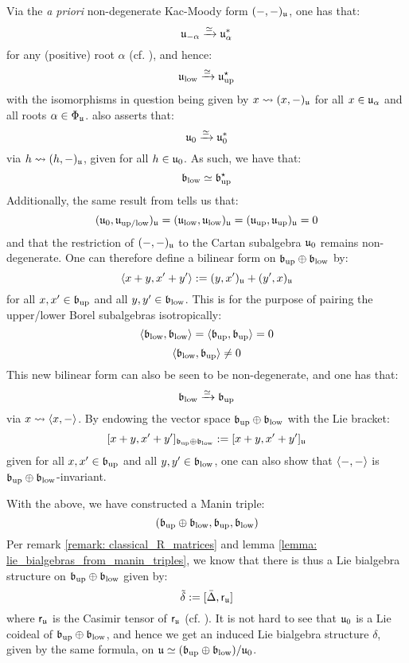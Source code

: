         \begin{example} \label{example: kac_moody_manin_triple}
            Via the \textit{a priori} non-degenerate Kac-Moody form $(-, -)_{\mathfrak{u}}$, one has that:
                $$\mathfrak{u}_{-\alpha} \xrightarrow[]{\simeq} \mathfrak{u}_{\alpha}^*$$
            for any (positive) root $\alpha$ (cf. \cite[Theorem 2.2]{kac_infinite_dimensional_lie_algebras}), and hence:
                $$\mathfrak{u}_{\mathrm{low}} \xrightarrow[]{\simeq} \mathfrak{u}_{\mathrm{up}}^{\star}$$
            with the isomorphisms in question being given by $x \leadsto (x, -)_{\mathfrak{u}}$ for all $x \in \mathfrak{u}_{\alpha}$ and all roots $\alpha \in \Phi_{\mathfrak{u}}$. \cite[Theorem 2.2]{kac_infinite_dimensional_lie_algebras} also asserts that:
                $$\mathfrak{u}_0 \xrightarrow[]{\simeq} \mathfrak{u}_0^*$$
            via $h \leadsto (h, -)_{\mathfrak{u}}$, given for all $h \in \mathfrak{u}_0$. As such, we have that:
                $$\mathfrak{b}_{\mathrm{low}} \simeq \mathfrak{b}_{\mathrm{up}}^{\star}$$
            Additionally, the same result from \cite{kac_infinite_dimensional_lie_algebras} tells us that:
                $$(\mathfrak{u}_0, \mathfrak{u}_{\mathrm{up}/\mathrm{low}})_{\mathfrak{u}} = (\mathfrak{u}_{\mathrm{low}}, \mathfrak{u}_{\mathrm{low}})_{\mathfrak{u}} = (\mathfrak{u}_{\mathrm{up}}, \mathfrak{u}_{\mathrm{up}})_{\mathfrak{u}} = 0$$
            and that the restriction of $(-, -)_{\mathfrak{u}}$ to the Cartan subalgebra $\mathfrak{u}_0$ remains non-degenerate. One can therefore define a bilinear form on $\mathfrak{b}_{\mathrm{up}} \oplus \mathfrak{b}_{\mathrm{low}}$ by:
                $$\langle x + y, x' + y'\rangle := (y, x')_{\mathfrak{u}} + (y', x)_{\mathfrak{u}}$$
            for all $x, x' \in \mathfrak{b}_{\mathrm{up}}$ and all $y, y' \in \mathfrak{b}_{\mathrm{low}}$. This is for the purpose of pairing the upper/lower Borel subalgebras isotropically:
                $$\langle\mathfrak{b}_{\mathrm{low}}, \mathfrak{b}_{\mathrm{low}}\rangle = \langle\mathfrak{b}_{\mathrm{up}}, \mathfrak{b}_{\mathrm{up}}\rangle = 0$$
                $$\langle\mathfrak{b}_{\mathrm{low}}, \mathfrak{b}_{\mathrm{up}}\rangle \not = 0$$
            This new bilinear form can also be seen to be non-degenerate, and one has that:
                $$\mathfrak{b}_{\mathrm{low}} \xrightarrow[]{\simeq} \mathfrak{b}_{\mathrm{up}}$$
            via $x \leadsto \langle x, -\rangle$. By endowing the vector space $\mathfrak{b}_{\mathrm{up}} \oplus \mathfrak{b}_{\mathrm{low}}$ with the Lie bracket:
                $$[x + y, x' + y']_{\mathfrak{b}_{\mathrm{up}} \oplus \mathfrak{b}_{\mathrm{low}}} := [x + y, x' + y']_{\mathfrak{u}}$$
            given for all $x, x' \in \mathfrak{b}_{\mathrm{up}}$ and all $y, y' \in \mathfrak{b}_{\mathrm{low}}$, one can also show that $\langle-, -\rangle$ is $\mathfrak{b}_{\mathrm{up}} \oplus \mathfrak{b}_{\mathrm{low}}$-invariant.

            With the above, we have constructed a Manin triple:
                $$(\mathfrak{b}_{\mathrm{up}} \oplus \mathfrak{b}_{\mathrm{low}}, \mathfrak{b}_{\mathrm{up}}, \mathfrak{b}_{\mathrm{low}})$$
            Per remark \ref{remark: classical_R_matrices} and lemma \ref{lemma: lie_bialgebras_from_manin_triples}, we know that there is thus a Lie bialgebra structure on $\mathfrak{b}_{\mathrm{up}} \oplus \mathfrak{b}_{\mathrm{low}}$ given by:
                $$\tilde{\delta} := [\bar{\Delta}, \mathsf{r}_{\mathfrak{u}}]$$
            where $\mathsf{r}_{\mathfrak{u}}$ is the Casimir tensor of $\mathsf{r}_{\mathfrak{u}}$ (cf. \cite[Section 2.5]{kac_infinite_dimensional_lie_algebras}). It is not hard to see that $\mathfrak{u}_0$ is a Lie coideal of $\mathfrak{b}_{\mathrm{up}} \oplus \mathfrak{b}_{\mathrm{low}}$, and hence we get an induced Lie bialgebra structure $\delta$, given by the same formula, on $\mathfrak{u} \simeq (\mathfrak{b}_{\mathrm{up}} \oplus \mathfrak{b}_{\mathrm{low}})/\mathfrak{u}_0$.
            

\end{example}
